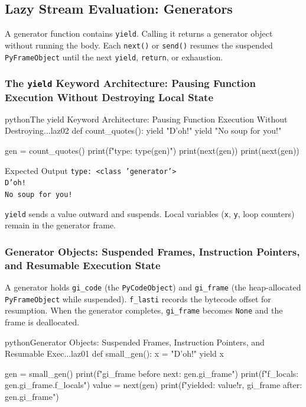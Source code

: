 \subsection{Lazy Stream Evaluation: Generators}

A generator function contains \texttt{yield}. Calling it returns a generator object without running the body. Each \texttt{next()} or \texttt{send()} resumes the suspended \texttt{PyFrameObject} until the next \texttt{yield}, \texttt{return}, or exhaustion.

\subsubsection{The \texttt{yield} Keyword Architecture: Pausing Function Execution Without Destroying Local State}

\begin{codebox}[]{python}{The yield Keyword Architecture: Pausing Function Execution Without Destroying...}{laz02}
def count_quotes():
    yield "D'oh!"
    yield "No soup for you!"

gen = count_quotes()
print(f"type: {type(gen)}")
print(next(gen))
print(next(gen))
\end{codebox}


\begin{iobox}{Expected Output}
\texttt{type: <class 'generator'>} \\
\texttt{D'oh!} \\
\texttt{No soup for you!} \\
\end{iobox}




\texttt{yield} sends a value outward and suspends. Local variables (\texttt{x}, \texttt{y}, loop counters) remain in the generator frame.

\subsubsection{Generator Objects: Suspended Frames, Instruction Pointers, and Resumable Execution State}

A generator holds \texttt{gi\_code} (the \texttt{PyCodeObject}) and \texttt{gi\_frame} (the heap-allocated \texttt{PyFrameObject} while suspended). \texttt{f\_lasti} records the bytecode offset for resumption. When the generator completes, \texttt{gi\_frame} becomes \texttt{None} and the frame is deallocated.

\begin{codebox}[]{python}{Generator Objects: Suspended Frames, Instruction Pointers, and Resumable Exec...}{laz01}
def small_gen():
    x = "D'oh!"
    yield x

gen = small_gen()
print(f"gi_frame before next: {gen.gi_frame}")
print(f"f_locals: {gen.gi_frame.f_locals}")
value = next(gen)
print(f"yielded: {value!r}, gi_frame after: {gen.gi_frame}")
\end{codebox}


